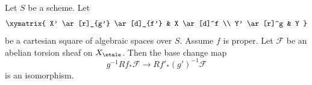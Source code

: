 %
\begin{theorem}
\label{theorem-proper-base-change}
Let $S$ be a scheme. Let
$$
\xymatrix{
X' \ar[r]_{g'} \ar[d]_{f'} & X \ar[d]^f \\
Y' \ar[r]^g & Y
}
$$
be a cartesian square of algebraic spaces over $S$.
Assume $f$ is proper.
Let $\mathcal{F}$ be an abelian torsion sheaf on $X_\etale$.
Then the base change map
$$
g^{-1}Rf_*\mathcal{F} \longrightarrow Rf'_*(g')^{-1}\mathcal{F}
$$
is an isomorphism.
\end{theorem}

